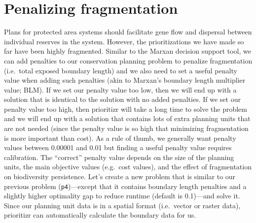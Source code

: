 \documentclass[
  12pt,
]{book}
\begin{document}
\hypertarget{penalizing-fragmentation}{%
\section{Penalizing fragmentation}\label{penalizing-fragmentation}}

Plans for protected area systems should facilitate gene flow and dispersal between individual reserves in the system. However, the prioritizations we have made so far have been highly fragmented. Similar to the Marxan decision support tool, we can add penalties to our conservation planning problem to penalize fragmentation (i.e.~total exposed boundary length) and we also need to set a useful penalty value when adding such penalties (akin to Marxan's boundary length multiplier value; BLM). If we set our penalty value too low, then we will end up with a solution that is identical to the solution with no added penalties. If we set our penalty value too high, then prioritizr will take a long time to solve the problem and we will end up with a solution that contains lots of extra planning units that are not needed (since the penalty value is so high that minimizing fragmentation is more important than cost). As a rule of thumb, we generally want penalty values between 0.00001 and 0.01 but finding a useful penalty value requires calibration. The ``correct'' penalty value depends on the size of the planning units, the main objective values (e.g.~cost values), and the effect of fragmentation on biodiversity persistence. Let's create a new problem that is similar to our previous problem (\texttt{p4})---except that it contains boundary length penalties and a slightly higher optimality gap to reduce runtime (default is 0.1)---and solve it. Since our planning unit data is in a spatial format (i.e.~vector or raster data), prioritizr can automatically calculate the boundary data for us.

\clearpage
\end{document}
